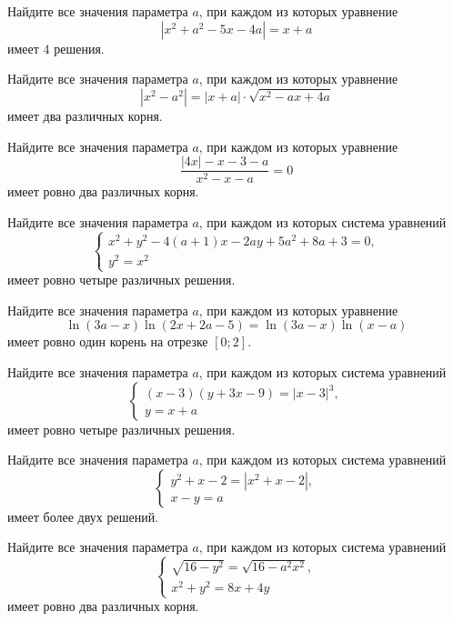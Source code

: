 \begin{class}[number=5]
	\begin{listofex}
		\item Найдите все значения параметра \( a \), при каждом из которых уравнение
		\[ |x^2+a^2-5x-4a|=x+a \]
		имеет \( 4 \) решения.
		\item Найдите все значения параметра \( a \), при каждом из которых уравнение
		\[ |x^2-a^2|=|x+a|\cdot\sqrt{x^2-ax+4a} \]
		имеет два различных корня.
		\item Найдите все значения параметра \( a \), при каждом из которых уравнение
		\[ \dfrac{|4x|-x-3-a}{x^2-x-a}=0 \]
		имеет ровно два различных корня.
		\item Найдите все значения параметра \( a \), при каждом из которых система уравнений
		\[ \left\{
		\begin{array}{l}
			x^2+y^2-4(a+1)x-2ay+5a^2+8a+3=0,\\
			y^2=x^2
		\end{array}
		\right. \]
		имеет ровно четыре различных решения.
		\item Найдите все значения параметра \( a \), при каждом из которых уравнение
		\[\ln(3a-x)\ln(2x+2a-5)=\ln(3a-x)\ln(x-a) \]
		имеет ровно один корень на отрезке \( [0;2] \).
		\item Найдите все значения параметра \( a \), при каждом из которых система уравнений
		\[ \left\{
		\begin{array}{l}
			(x-3)(y+3x-9)=|x-3|^3,\\
			y=x+a
		\end{array}
		\right. \]
		имеет ровно четыре различных решения.
		\item Найдите все значения параметра \( a \), при каждом из которых система уравнений
		\[ \left\{
		\begin{array}{l}
			y^2+x-2=|x^2+x-2|,\\
			x-y=a
		\end{array}
		\right. \]
		имеет более двух решений.
		\item Найдите все значения параметра \( a \), при каждом из которых система уравнений
		\[ \left\{
		\begin{array}{l}
			\sqrt{16-y^2}=\sqrt{16-a^2x^2},\\
			x^2+y^2=8x+4y
		\end{array}
		\right. \]
		имеет ровно два различных корня.
	\end{listofex}
\end{class}

